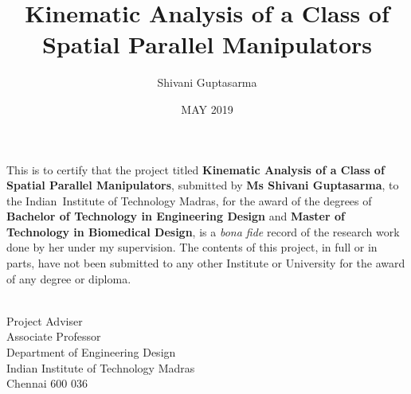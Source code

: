 \documentclass[DD]{iitmdiss}
\begin{document}
\VerbatimFootnotes
\title{Kinematic Analysis of a Class of Spatial Parallel Manipulators}

\author{Shivani Guptasarma}

\date{MAY 2019}

\maketitle

\certificate

\vspace*{0.5in}

\noindent This is to certify that the project titled {\bf Kinematic Analysis of a Class of Spatial Parallel Manipulators}, submitted by {\bf Ms Shivani Guptasarma}, to the {Indian~Institute of Technology Madras}, for
the award of the degrees of {\bf Bachelor of Technology in Engineering Design} and {\bf Master of Technology in Biomedical Design}, is a \textit{bona fide}
record of the research work done by her under my supervision.  The
contents of this project, in full or in parts, have not been submitted
to any other Institute or University for the award of any degree or
diploma. 

\vspace*{1.5in}

\begin{singlespacing}
	\hspace*{-0.25in}
	\parbox{3in}{
		 \\
		\noindent Project Adviser \\ 
		\noindent Associate Professor \\
		\noindent Department of Engineering Design\\
		\noindent Indian Institute of Technology Madras \\
		\noindent Chennai 600 036
	} 
\end{singlespacing}
\vspace*{0.25in}
\end{document}
